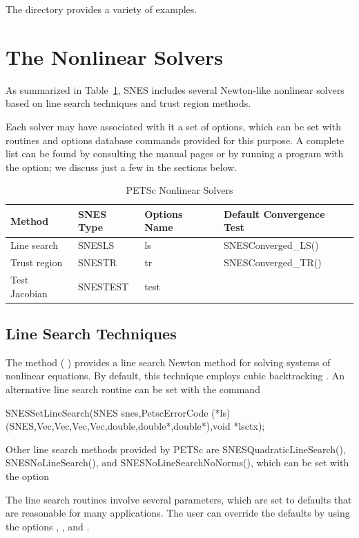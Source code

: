 The directory  provides
a variety of examples.


\section{The Nonlinear Solvers}
\label{sec_nlsolvers}

As summarized in Table~\ref{tab_snesdefaults}, SNES includes several
Newton-like nonlinear solvers based on line search techniques and
trust region methods.

Each solver may have associated with it a set of options, which can be
set with routines and options database commands provided for this
purpose.  A complete list can be found by consulting the manual pages
or by running a program with the  option; we discuss just a
few in the sections below.

\begin{table}
\begin{center}
\begin{tabular}{llll}
{\bf Method}    &{\bf SNES Type}& {\bf Options Name}    &{\bf Default Convergence Test}\\
\hline
Line search     & SNESLS   & ls   & SNESConverged\_LS()\\
Trust region    & SNESTR   & tr   & SNESConverged\_TR()\\
Test Jacobian   & SNESTEST        & test  & \\
\hline
\end{tabular}
\end{center}
\label{tab_snesdefaults}
\caption{PETSc Nonlinear Solvers}
\end{table}

\subsection{Line Search Techniques} 

The method  ( ) provides a line
search Newton method for solving systems of nonlinear equations.  By
default, this technique employs cubic backtracking \cite{dennis:83}.
An alternative line search routine can be set with the command
\begin{tabbing}
  SNESSetLineSearch(SNES snes,PetscErrorCode (*ls)(SNES,Vec,Vec,Vec,Vec,double,double*,double*),void *lsctx);
\end{tabbing}
Other line search methods provided by PETSc are 
SNESQuadraticLineSearch(), SNESNoLineSearch(), and SNESNoLineSearchNoNorms(),
 
which can be set with the option 
\begin{tabbing}
\end{tabbing}
The line search routines involve several parameters, which are set
to defaults that are reasonable for many applications.  The user
can override the defaults by using the options
, 
, and 
. 

